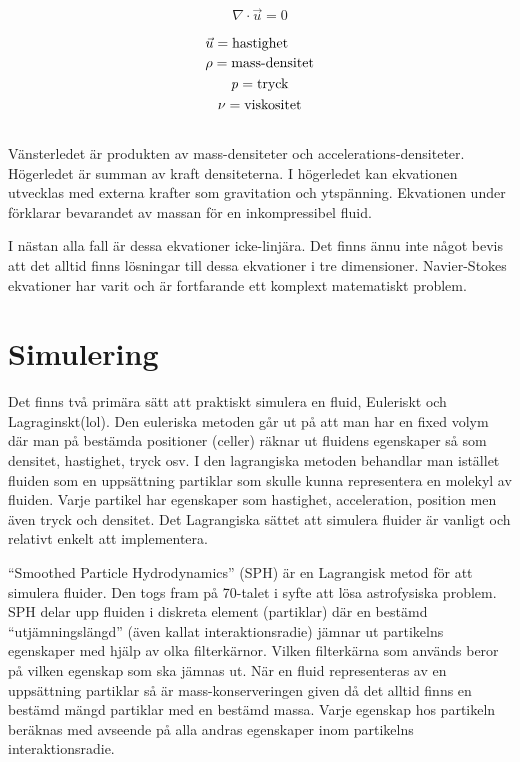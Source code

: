 \documentclass[a4paper,12pt,oneside,final]{extarticle}
\begin{document}
\begin{equation}
\nabla \cdot \vec{u} = 0
\end{equation}

\begin{equation*}
\begin{aligned}
\begin{multlined}
\vec{u} = \mbox{hastighet} \\
\rho = \mbox{mass-densitet} \\
\it{p} = \mbox{tryck} \\
\nu = \mbox{viskositet} \\
\end{multlined}
\end{aligned}
\end{equation*}
Vänsterledet är produkten av mass-densiteter och accelerations-densiteter.
Högerledet är summan av kraft densiteterna.
I högerledet kan ekvationen utvecklas med externa krafter som gravitation och ytspänning.
Ekvationen under förklarar bevarandet av massan för en inkompressibel fluid.

I nästan alla fall är dessa ekvationer icke-linjära.
Det finns ännu inte något bevis att det alltid finns lösningar till dessa ekvationer i tre dimensioner.
Navier-Stokes ekvationer har varit och är fortfarande ett komplext matematiskt problem.

\section{Simulering}
Det finns två primära sätt att praktiskt simulera en fluid, Euleriskt och Lagraginskt(lol).
Den euleriska metoden går ut på att man har en fixed volym där man på bestämda positioner (celler) räknar ut fluidens egenskaper så som densitet, hastighet, tryck osv.
I den lagrangiska metoden behandlar man istället fluiden som en uppsättning partiklar som skulle kunna representera en molekyl av fluiden.
Varje partikel har egenskaper som hastighet, acceleration, position men även tryck och densitet.
Det Lagrangiska sättet att simulera fluider är vanligt och relativt enkelt att implementera.

“Smoothed Particle Hydrodynamics” (SPH)\cite{sph} är en Lagrangisk metod för att simulera fluider.
Den togs fram på 70-talet i syfte att lösa astrofysiska problem.
SPH delar upp fluiden i diskreta element (partiklar) där en bestämd “utjämningslängd” (även kallat interaktionsradie) jämnar ut partikelns egenskaper med hjälp av olka filterkärnor.
Vilken filterkärna som används beror på vilken egenskap som ska jämnas ut.
När en fluid representeras av en uppsättning partiklar så är mass-konserveringen given då det alltid finns en bestämd mängd partiklar med en bestämd massa.
Varje egenskap hos partikeln beräknas med avseende på alla andras egenskaper inom partikelns interaktionsradie.
\end{document}
